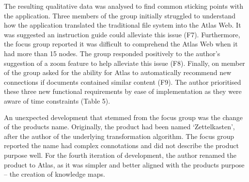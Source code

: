 \documentclass{article}
\begin{document}
The resulting qualitative data was analysed to find common sticking points with the application. Three members of the group initially struggled to understand how the application translated the traditional file system into the Atlas Web. It was suggested an instruction guide could alleviate this issue (F7). Furthermore, the focus group reported it was difficult to comprehend the Atlas Web when it had more than 15 nodes. The group responded positively to the author's suggestion of a zoom feature to help alleviate this issue (F8). Finally, on member of the group asked for the ability for Atlas to automatically recommend new connections if documents contained similar content (F9). The author prioritised these three new functional requirements by ease of implementation as they were aware of time constraints (Table 5).

\begin{table}[!h]
\centering
\caption{The functional requirements and use case descriptions that defined the third iteration of Atlas.}
\label{tab:my-table}
\end{table}

An unexpected development that stemmed from the focus group was the change of the products name. Originally, the product had been named ‘Zettelkasten’, after the author of the underlying transformation algorithm. The focus group reported the name had complex connotations and did not describe the product purpose well. For the fourth iteration of development, the author renamed the product to Atlas, as it was simpler and better aligned with the products purpose – the creation of knowledge maps.
\end{document}
